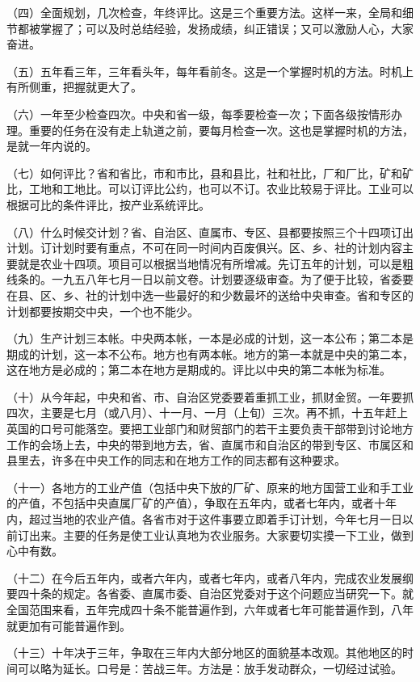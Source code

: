 （四）全面规划，几次检查，年终评比。这是三个重要方法。这样一来，全局和细节都被掌握了；可以及时总结经验，发扬成绩，纠正错误；又可以激励人心，大家奋进。

（五）五年看三年，三年看头年，每年看前冬。这是一个掌握时机的方法。时机上有所侧重，把握就更大了。

（六）一年至少检查四次。中央和省一级，每季要检查一次；下面各级按情形办理。重要的任务在没有走上轨道之前，要每月检查一次。这也是掌握时机的方法，是就一年内说的。

（七）如何评比？省和省比，市和市比，县和县比，社和社比，厂和厂比，矿和矿比，工地和工地比。可以订评比公约，也可以不订。农业比较易于评比。工业可以根据可比的条件评比，按产业系统评比。

（八）什么时候交计划？省、自治区、直属市、专区、县都要按照三个十四项订出计划。订计划时要有重点，不可在同一时间内百废俱兴。区、乡、社的计划内容主要就是农业十四项。项目可以根据当地情况有所增减。先订五年的计划，可以是粗线条的。一九五八年七月一日以前文卷。计划要逐级审查。为了便于比较，省委要在县、区、乡、社的计划中选一些最好的和少数最坏的送给中央审查。省和专区的计划都要按期交中央，一个也不能少。

（九）生产计划三本帐。中央两本帐，一本是必成的计划，这一本公布；第二本是期成的计划，这一本不公布。地方也有两本帐。地方的第一本就是中央的第二本，这在地方是必成的；第二本在地方是期成的。评比以中央的第二本帐为标准。

（十）从今年起，中央和省、市、自治区党委要着重抓工业，抓财金贸。一年要抓四次，主要是七月（或八月）、十一月、一月（上旬）三次。再不抓，十五年赶上英国的口号可能落空。要把工业部门和财贸部门的若干主要负责干部带到讨论地方工作的会场上去，中央的带到地方去，省、直属市和自治区的带到专区、市属区和县里去，许多在中央工作的同志和在地方工作的同志都有这种要求。

（十一）各地方的工业产值（包括中央下放的厂矿、原来的地方国营工业和手工业的产值，不包括中央直属厂矿的产值），争取在五年内，或者七年内，或者十年内，超过当地的农业产值。各省市对于这件事要立即着手订计划，今年七月一日以前订出来。主要的任务是使工业认真地为农业服务。大家要切实摸一下工业，做到心中有数。

（十二）在今后五年内，或者六年内，或者七年内，或者八年内，完成农业发展纲要四十条的规定。各省委、直属市委、自治区党委对于这个问题应当研究一下。就全国范围来看，五年完成四十条不能普遍作到，六年或者七年可能普遍作到，八年就更加有可能普遍作到。

（十三）十年决于三年，争取在三年内大部分地区的面貌基本改观。其他地区的时间可以略为延长。口号是：苦战三年。方法是：放手发动群众，一切经过试验。

